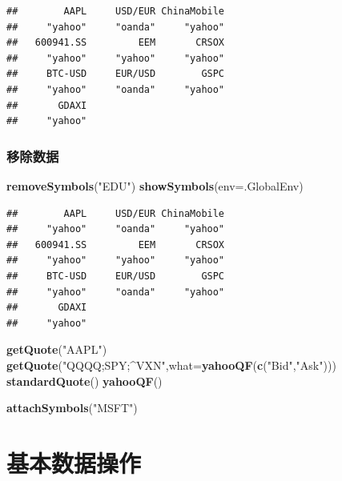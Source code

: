 \documentclass[]{ctexbook}
\newenvironment{Shaded}{\begin{snugshade}}{\end{snugshade}}
\newcommand{\AttributeTok}[1]{\textcolor[rgb]{0.13,0.29,0.53}{#1}}
\newcommand{\FunctionTok}[1]{\textcolor[rgb]{0.13,0.29,0.53}{\textbf{#1}}}
\newcommand{\NormalTok}[1]{#1}
\newcommand{\StringTok}[1]{\textcolor[rgb]{0.31,0.60,0.02}{#1}}
\begin{document}
\begin{verbatim}
##        AAPL     USD/EUR ChinaMobile 
##     "yahoo"     "oanda"     "yahoo" 
##   600941.SS         EEM       CRSOX 
##     "yahoo"     "yahoo"     "yahoo" 
##     BTC-USD     EUR/USD        GSPC 
##     "yahoo"     "oanda"     "yahoo" 
##       GDAXI 
##     "yahoo"
\end{verbatim}

\subsection{移除数据}\label{ux79fbux9664ux6570ux636e}

\begin{Shaded}
\begin{Highlighting}[]
\FunctionTok{removeSymbols}\NormalTok{(}\StringTok{"EDU"}\NormalTok{)}
\FunctionTok{showSymbols}\NormalTok{(}\AttributeTok{env=}\NormalTok{.GlobalEnv)}
\end{Highlighting}
\end{Shaded}

\begin{verbatim}
##        AAPL     USD/EUR ChinaMobile 
##     "yahoo"     "oanda"     "yahoo" 
##   600941.SS         EEM       CRSOX 
##     "yahoo"     "yahoo"     "yahoo" 
##     BTC-USD     EUR/USD        GSPC 
##     "yahoo"     "oanda"     "yahoo" 
##       GDAXI 
##     "yahoo"
\end{verbatim}

\begin{Shaded}
\begin{Highlighting}[]
\FunctionTok{getQuote}\NormalTok{(}\StringTok{"AAPL"}\NormalTok{)}
\FunctionTok{getQuote}\NormalTok{(}\StringTok{"QQQQ;SPY;\^{}VXN"}\NormalTok{,}\AttributeTok{what=}\FunctionTok{yahooQF}\NormalTok{(}\FunctionTok{c}\NormalTok{(}\StringTok{"Bid"}\NormalTok{,}\StringTok{"Ask"}\NormalTok{)))}
\FunctionTok{standardQuote}\NormalTok{()}
\FunctionTok{yahooQF}\NormalTok{()}
\end{Highlighting}
\end{Shaded}

\begin{Shaded}
\begin{Highlighting}[]
\FunctionTok{attachSymbols}\NormalTok{(}\StringTok{"MSFT"}\NormalTok{)}
\end{Highlighting}
\end{Shaded}

\chapter{基本数据操作}\label{manipulation}
\end{document}
